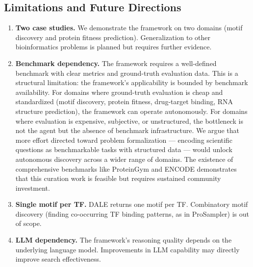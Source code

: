 \documentclass[11pt,a4paper]{article}
\begin{document}
\subsection{Limitations and Future Directions}

\begin{enumerate}
    \item \textbf{Two case studies.} We demonstrate the framework on two domains (motif discovery and protein fitness prediction). Generalization to other bioinformatics problems is planned but requires further evidence.
    
    \item \textbf{Benchmark dependency.} The framework requires a well-defined benchmark with clear metrics and ground-truth evaluation data. This is a structural limitation: the framework's applicability is bounded by benchmark availability. For domains where ground-truth evaluation is cheap and standardized (motif discovery, protein fitness, drug-target binding, RNA structure prediction), the framework can operate autonomously. For domains where evaluation is expensive, subjective, or unstructured, the bottleneck is not the agent but the absence of benchmark infrastructure. We argue that more effort directed toward problem formalization --- encoding scientific questions as benchmarkable tasks with structured data --- would unlock autonomous discovery across a wider range of domains. The existence of comprehensive benchmarks like ProteinGym \citep{notin2023proteingym} and ENCODE demonstrates that this curation work is feasible but requires sustained community investment.
    
    \item \textbf{Single motif per TF.} DALE returns one motif per TF. Combinatory motif discovery (finding co-occurring TF binding patterns, as in ProSampler) is out of scope.
    
    \item \textbf{LLM dependency.} The framework's reasoning quality depends on the underlying language model. Improvements in LLM capability may directly improve search effectiveness.
    

\end{enumerate}
\end{document}
